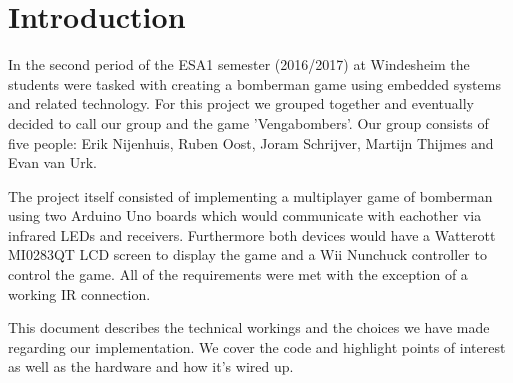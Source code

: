 \section{Introduction}
\label{sec:introduction}

In the second period of the ESA1 semester (2016/2017) at Windesheim the
students were tasked with creating a bomberman game using embedded systems and
related technology. For this project we grouped together and eventually
decided to call our group and the game 'Vengabombers'. Our group consists of
five people: Erik Nijenhuis, Ruben Oost, Joram Schrijver, Martijn Thijmes and
Evan van Urk.

The project itself consisted of implementing a multiplayer game of bomberman
using two Arduino Uno boards which would communicate with eachother via
infrared LEDs and receivers. Furthermore both devices would have a Watterott
MI0283QT LCD screen to display the game and a Wii Nunchuck controller to
control the game. All of the requirements were met with the exception of a
working IR connection.

This document describes the technical workings and the choices we have made
regarding our implementation. We cover the code and highlight points of
interest as well as the hardware and how it's wired up.
